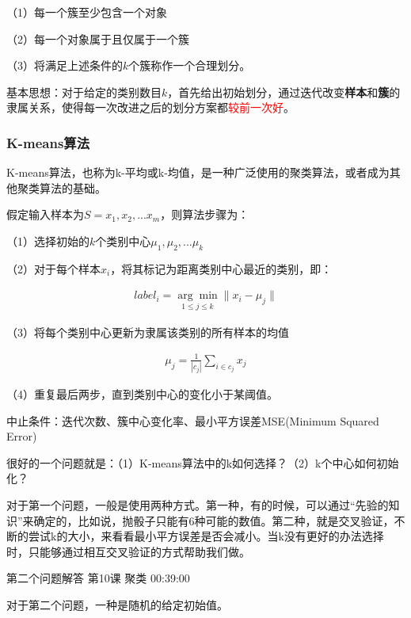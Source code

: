 \documentclass[UTF8]{ctexbook}
\begin{document}
（1）每一个簇至少包含一个对象

（2）每一个对象属于且仅属于一个簇

（3）将满足上述条件的$k$个簇称作一个合理划分。

基本思想：对于给定的类别数目$k$，首先给出初始划分，通过迭代改变\textbf{样本}和\textbf{簇}的隶属关系，使得每一次改进之后的划分方案都\textcolor{red}{较前一次好}。

\subsubsection{K-means算法}

K-means算法，也称为k-平均或k-均值，是一种广泛使用的聚类算法，或者成为其他聚类算法的基础。

假定输入样本为$S=x_{1},x_{2},...x_{m}$，则算法步骤为：

（1）选择初始的$k$个类别中心$\mu_{1},\mu_{2},...\mu_{k}$

（2）对于每个样本$x_{i}$，将其标记为距离类别中心最近的类别，即：

\begin{equation}
\begin{aligned}
label_{i} = \underset{1 \leq j \leq k}{\arg \min}  \parallel x_{i}-\mu_{j} \parallel
\end{aligned}
\end{equation}

（3）将每个类别中心更新为隶属该类别的所有样本的均值

\begin{equation}
\begin{aligned}
\mu_{j} = \frac{1}{|c_{j}|} \sum_{i \in c_{j}}^{ }x_{j}
\end{aligned}
\end{equation}

（4）重复最后两步，直到类别中心的变化小于某阈值。

中止条件：迭代次数、簇中心变化率、最小平方误差MSE(Minimum Squared Error)

很好的一个问题就是：（1）K-means算法中的k如何选择？（2）k个中心如何初始化？

对于第一个问题，一般是使用两种方式。第一种，有的时候，可以通过“先验的知识”来确定的，比如说，抛骰子只能有6种可能的数值。第二种，就是交叉验证，不断的尝试k的大小，来看看最小平方误差是否会减小。当k没有更好的办法选择时，只能够通过相互交叉验证的方式帮助我们做。

第二个问题解答 第10课 聚类 00:39:00

对于第二个问题，一种是随机的给定初始值。
\end{document}
